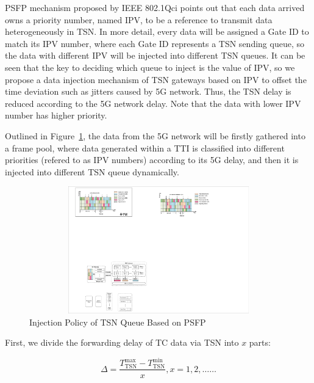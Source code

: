 \documentclass{SCIS2021}
\begin{document}
	\par PSFP mechanism proposed by IEEE 802.1Qci points out that each data arrived owns a priority number, named IPV, to be a reference to transmit data heterogeneously in TSN. In more detail, every data will be assigned a Gate ID to match its IPV number, where each Gate ID represents a TSN sending queue, so the data with different IPV will be injected into different TSN queues. It can be seen that the key to deciding which queue to inject is the value of IPV, so we propose a data injection mechanism of TSN gateways based on IPV to offset the time deviation such as jitters caused by 5G network. Thus, the TSN delay is reduced according to the 5G network delay. Note that the data with lower IPV number has higher priority.
	
	\par Outlined in Figure~\ref{fig:Injection Policy}, the data from the 5G network will be firstly gathered into a frame pool, where data generated within a TTI is classified into different priorities (refered to as IPV numbers) according to its 5G delay, and then it is injected into different TSN queue dynamically.
	
	\begin{figure}[t] 
		\centering 
		\includegraphics[height=5.5cm, width=14cm]{Injection} 
		\caption{Injection Policy of TSN Queue Based on PSFP} 
		\label{fig:Injection Policy}
	\end{figure}
	
	
	
	\par First, we divide the forwarding delay of TC data via TSN into $x$ parts:
	
	\setlength\abovedisplayskip{-16pt}
	\begin{center}
		\begin{equation}
			\Delta=\frac{T_{\text{TSN}}^{\text{max}}-T_{\text{TSN}}^{\text{min}}}{x}, x=1,2, \ldots \ldots
		\end{equation}
	\end{center}
	\setlength\belowdisplayskip{-8pt}
	
\end{document}
